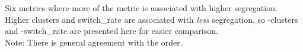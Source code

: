 \begin{table}[htbp]
\small{Six metrics where more of the metric is associated with higher segregation.\\
Higher clusters and switch\_rate are associated with \textit{less} segregation, so -clusters and -switch\_rate are presented here for easier comparison.\\
Note: There is general agreement with the order.}
\end{table}